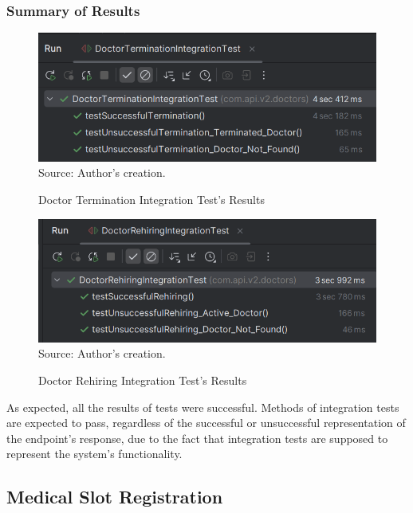 \subsubsection{Summary of Results}

\begin{figure}[H]
	\centering
	\caption{Doctor Termination Integration Test's Results}
	\includegraphics[width=1\linewidth]{figures/results_doctor_termination_integration_test.PNG}
	\label{fig:results_doctor_termination_integration_test}
	\footnotesize Source: Author's creation.
\end{figure}

\begin{figure}[H]
	\centering
	\caption{Doctor Rehiring Integration Test's Results}
	\includegraphics[width=1\linewidth]{figures/results_doctor_rehirirng_integration_test.PNG}
	\label{fig:results_doctor_rehirirng_integration_test}
	\footnotesize Source: Author's creation.
\end{figure}

As expected, all the results of tests were successful. Methods of integration tests are expected to pass, regardless of the successful or unsuccessful representation of the endpoint's response, due to the fact that integration tests are supposed to represent the system's functionality.

\subsection{Medical Slot Registration}

